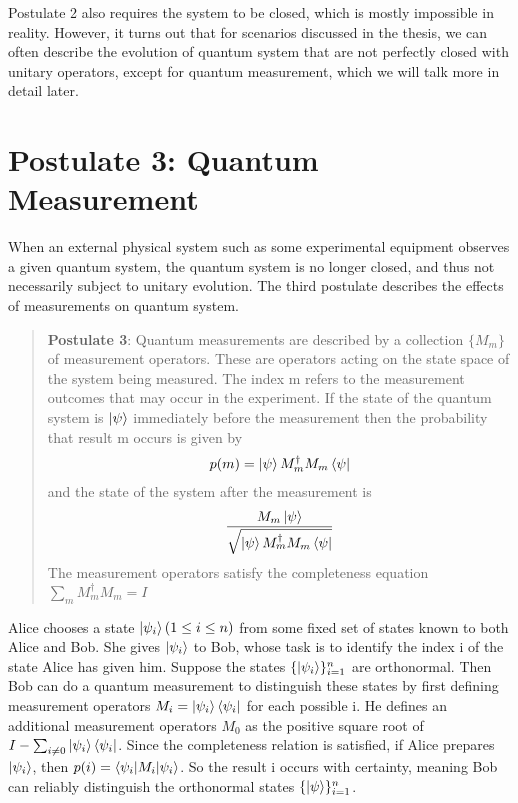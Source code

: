 \begin{example} 

\end{example}
Postulate 2 also requires the system to be closed, which is mostly impossible in reality. However, it turns out that for scenarios discussed in the thesis, we can often describe the evolution of quantum system that are not perfectly closed with unitary operators, except for quantum measurement, which we will talk more in detail later.

\section{Postulate 3: Quantum Measurement}
When an external physical system such as some experimental equipment observes a given quantum system, the quantum system is no longer closed, and thus not necessarily subject to unitary evolution. The third postulate describes the effects of measurements on quantum system. 

\begin{quote}
    \textbf{Postulate 3}: Quantum measurements are described by a collection $\{M_m\}$ of measurement operators. These are operators acting on the state space of the system being measured. The index m refers to the measurement outcomes that may occur in the experiment. If the state of the quantum system is $\ket{\psi}$ immediately before the measurement then the probability that result m occurs is given by 
    \begin{gather*}
        p(m)=\ket{\psi}M_m^\dagger M_m \bra{\psi}
    \end{gather*}
    and the state of the system after the measurement is
    \begin{gather*}
        \frac{M_m \ket{\psi}}{\sqrt{\ket{\psi}M_m^\dagger M_m \bra{\psi}}}
    \end{gather*}
    The measurement operators satisfy the completeness equation $\sum_m M_m^\dagger M_m =I$
\end{quote}

\begin{example} 
Alice chooses a state $\ket{\psi_i} (1 \le i \le n)$ from some fixed set of states known to both Alice and Bob. She gives $\ket{\psi_i}$ to Bob, whose task is to identify the index i of the state Alice has given him. Suppose the states $\{\ket{\psi_i}\}_{i=1}^n$ are orthonormal. Then Bob can do a quantum measurement to distinguish these states by first defining measurement operators $M_i=\ket{\psi_i}\bra{\psi_i}$ for each possible i. He defines an additional measurement operators $M_0$ as the positive square root of $I-\sum_{i \ne 0} \ket{\psi_i}\bra{\psi_i}$. Since the completeness relation is satisfied, if Alice prepares $\ket{\psi_i}$, then $p(i)=\braket{\psi_i | M_i |\psi_i}$. So the result i occurs with certainty, meaning Bob can reliably distinguish the orthonormal states $\{\ket{\psi}\}_{i=1}^n$.
\end{example}

